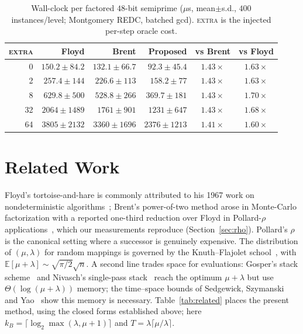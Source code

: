 \documentclass[11pt]{article}
\begin{document}
\begin{table}[H]\centering
\caption{Wall-clock per factored $48$-bit semiprime ($\mu$s, mean$\pm$s.d.,
$400$ instances/level; Montgomery REDC, batched gcd). \textsc{extra} is the
injected per-step oracle cost.}
\label{tab:rho-wallclock}
\begin{tabular}{rrrrcc}
\toprule
\textsc{extra} & Floyd & Brent & Proposed & vs Brent & vs Floyd\\
\midrule
0  & $150.2\pm84.2$ & $132.1\pm66.7$ & $92.3\pm45.4$ & $1.43\times$ & $1.63\times$\\
2  & $257.4\pm144$ & $226.6\pm113$ & $158.2\pm77$ & $1.43\times$ & $1.63\times$\\
8  & $629.8\pm500$ & $528.8\pm266$ & $369.7\pm181$ & $1.43\times$ & $1.70\times$\\
32 & $2064\pm1489$ & $1761\pm901$ & $1231\pm647$ & $1.43\times$ & $1.68\times$\\
64 & $3805\pm2132$ & $3360\pm1696$ & $2376\pm1213$ & $1.41\times$ & $1.60\times$\\
\bottomrule
\end{tabular}
\end{table}

\section{Related Work}
\label{sec:related}

Floyd's tortoise-and-hare is commonly attributed to his 1967 work on
nondeterministic algorithms~\cite{floyd1967}; Brent's power-of-two method arose
in Monte-Carlo factorization with a reported one-third reduction over Floyd in
Pollard-$\rho$ applications~\cite{brent1980}, which our measurements reproduce
(Section~\ref{sec:rho}). Pollard's $\rho$~\cite{pollard1975} is the canonical
setting where a successor is genuinely expensive. The distribution of
$(\mu,\lambda)$ for random mappings is governed by the Knuth--Flajolet
school~\cite{flajolet,sedgewick2013}, with $\mathbb E[\mu+\lambda]\sim\sqrt{\pi/2}\sqrt n$.
A second line trades space for evaluations: Gosper's stack scheme~\cite{gosper1972}
and Nivasch's single-pass stack~\cite{nivasch2004} reach the optimum
$\mu+\lambda$ but use $\Theta(\log(\mu+\lambda))$ memory; the time--space bounds
of Sedgewick, Szymanski and Yao~\cite{ssy1982} show this memory is necessary.
Table~\ref{tab:related} places the present method, using the closed forms
established above; here $k_B=\lceil\log_2\max(\lambda,\mu+1)\rceil$ and
$T=\lambda\lceil\mu/\lambda\rceil$.
\end{document}
